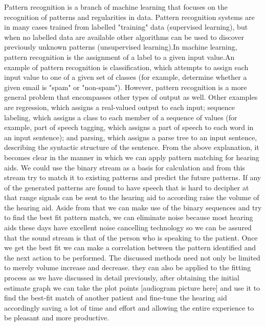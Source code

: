 \documentclass[sigconf]{acmart}
\begin{document}
Pattern recognition is a branch of machine learning that focuses on the recognition of patterns and regularities in data. Pattern recognition systems are in many cases trained from labelled "training" data (supervised learning), but when no labelled data are available other algorithms can be used to discover previously unknown patterns (unsupervised learning).In machine learning, pattern recognition is the assignment of a label to a given input value.An example of pattern recognition is classification, which attempts to assign each input value to one of a given set of classes (for example, determine whether a given email is "spam" or "non-spam"). However, pattern recognition is a more general problem that encompasses other types of output as well. Other examples are regression, which assigns a real-valued output to each input; sequence labeling, which assigns a class to each member of a sequence of values (for example, part of speech tagging, which assigns a part of speech to each word in an input sentence); and parsing, which assigns a parse tree to an input sentence, describing the syntactic structure of the sentence.
\newline
From the above explanation, it becomes clear in the manner in which we can apply pattern matching for hearing aids. We could use the binary stream as a basis for calculation and from this stream try to match it to existing patterns and predict the future patterns. If any of the generated patterns are found to have speech that is hard to decipher at that range signals can be sent to the hearing aid to according raise the volume of the hearing aid. Aside from that we can make use of the binary sequences and try to find the best fit pattern match, we can eliminate noise because most hearing aids these days have excellent noise cancelling technology so we can be assured that the sound stream is that of the person who is speaking to the patient. Once we get the best fit we can make a correlation between the pattern identified and the next action to be performed. 
\newline
The discussed methods need not only be limited to merely volume increase and decrease. they can also be applied to the fitting process as we have discussed in detail previously, after obtaining the initial estimate graph we can take the plot points [audiogram picture here] and use it to find the best-fit match of another patient  and fine-tune the hearing aid accordingly saving a lot of time and effort and allowing the entire experience to be pleasant and more productive.
\newline
\end{document}
